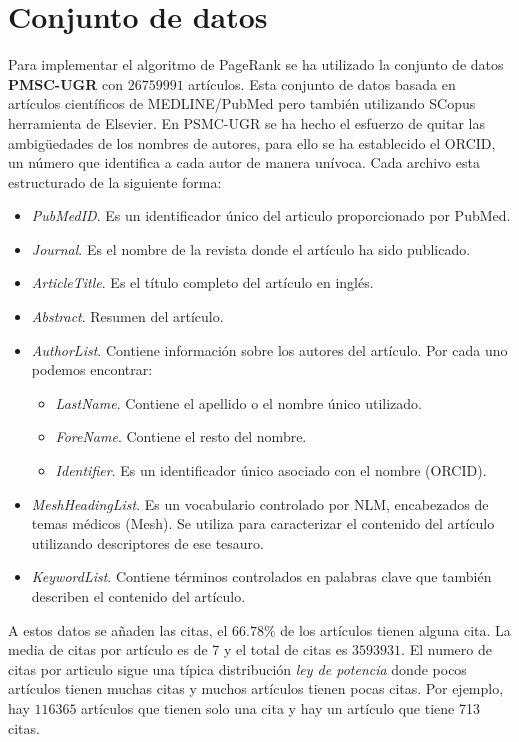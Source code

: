 \documentclass[size=a4, parskip=half, titlepage=false, toc=flat, toc=bib, 12pt]{scrartcl}
\theoremstyle{theorem-style}
\theoremstyle{definition-style}
\theoremstyle{remark-style}
\theoremstyle{example-style}
\theoremstyle{definition-style}
\theoremstyle{remark-style}
\begin{document}
\section{Conjunto de datos}
\label{Base de datos}
Para implementar el algoritmo de PageRank se ha utilizado la conjunto de datos \textbf{PMSC-UGR} con
$26759991$ artículos. Esta conjunto de datos basada en artículos científicos de MEDLINE/PubMed  pero
también utilizando SCopus herramienta de Elsevier. En PSMC-UGR se ha hecho el esfuerzo de
quitar las ambigüedades de los nombres de autores, para ello se ha establecido el ORCID, un número
que identifica a cada autor de manera unívoca. Cada archivo esta estructurado de la siguiente forma:
\begin{itemize}
\item \textit{PubMedID}. Es un identificador único del articulo proporcionado por PubMed.
\item \textit{Journal}. Es el nombre de la revista donde el artículo ha sido publicado.
\item \textit{ArticleTitle}. Es el título completo del artículo en inglés.
\item \textit{Abstract}. Resumen del artículo.
\item \textit{AuthorList}. Contiene información sobre los autores del artículo. Por cada uno podemos encontrar:
\begin{itemize}
\item \textit{LastName}. Contiene el apellido o el nombre único utilizado.
\item \textit{ForeName}. Contiene el resto del nombre.
\item \textit{Identifier}. Es un identificador único asociado con el nombre (ORCID).
\end{itemize}
\item \textit{MeshHeadingList}. Es un vocabulario controlado por NLM, encabezados de temas médicos (Mesh). Se utiliza para caracterizar el contenido del artículo utilizando descriptores de ese tesauro.
\item \textit{KeywordList}. Contiene términos controlados en palabras clave que también describen el contenido del artículo.
\end{itemize}

A estos datos se añaden las citas, el $66.78 \%$ de los artículos tienen alguna cita. La media de citas por artículo es de 7 y el total de citas es $3593931$. El numero de citas por articulo sigue una típica distribución \textit{ley de potencia} donde pocos artículos tienen muchas citas y muchos artículos tienen pocas citas. Por ejemplo, hay $116365$ artículos que tienen solo una cita y hay un artículo que tiene 713 citas.
\end{document}
